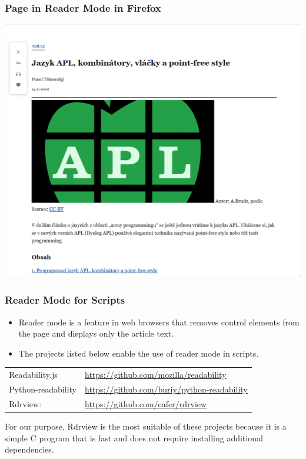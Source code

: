 \begin{frame}
  \frametitle{Page in Reader Mode in Firefox}
  \begin{center}
    \includegraphics[height=.7\textheight]{img/root-čtečka.png}
  \end{center}
\end{frame}

\begin{frame}
  \frametitle{Reader Mode for Scripts}
  \begin{itemize}
    \item Reader mode is a feature in web browsers that removes control elements from the page and displays only the article text.
    \item The projects listed below enable the use of reader mode in scripts.
  \end{itemize}

  \bigskip

  \begin{tabular}{ll}
    Readability.js & \url{https://github.com/mozilla/readability}\\
    Python-readability & \url{https://github.com/buriy/python-readability}\\
    Rdrview: & \url{https://github.com/eafer/rdrview}\\
  \end{tabular}

\end{frame}

For our purpose, Rdrview is the most suitable of these projects because it is a
simple C program that is fast and does not require installing additional
dependencies.



